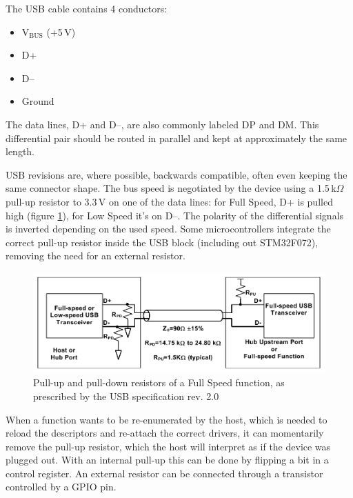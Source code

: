 The \gls{USB} cable contains 4 conductors:

\begin{itemize}\setlength\itemsep{.2em}
	\item V$_\mathrm{BUS}$ (+5\,V)
	\item D+
	\item D--
	\item Ground
\end{itemize}

The data lines, D+ and D--, are also commonly labeled DP and DM. This differential pair should be routed in parallel and kept at approximately the same length.

\gls{USB} revisions are, where possible, backwards compatible, often even keeping the same connector shape. The bus speed is negotiated by the device using a 1.5\,k$\Omega$ pull-up resistor to 3.3\,V on one of the data lines: for Full Speed, D+ is pulled high (figure \ref{fig:usb-pullup-fs}), for Low Speed it's on D--. The polarity of the differential signals is inverted depending on the used speed. Some microcontrollers integrate the correct pull-up resistor inside the \gls{USB} block (including out STM32F072), removing the need for an external resistor.

\begin{figure}
	\centering
	\includegraphics[width=.8\textwidth]{img/usb-pullup-fs.png}
	\caption[USB pull-ups]{\label{fig:usb-pullup-fs}Pull-up and pull-down resistors of a Full Speed function, as prescribed by the USB specification rev. 2.0}
\end{figure}

When a function wants to be re-enumerated by the host, which is needed to reload the descriptors and re-attach the correct drivers, it can momentarily remove the pull-up resistor, which the host will interpret as if the device was plugged out. With an internal pull-up this can be done by flipping a bit in a control register. An external resistor can be connected through a transistor controlled by a \gls{GPIO} pin. 


